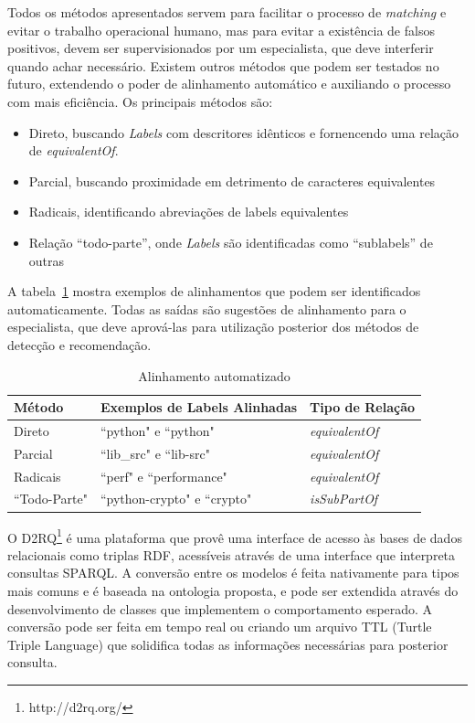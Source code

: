 \documentclass[sigconf]{acmart}
\begin{document}
Todos os métodos apresentados servem para facilitar o processo de \textit{matching} e evitar o trabalho operacional humano, mas para evitar a existência de falsos positivos, devem ser supervisionados por um especialista, que deve interferir quando achar necessário. Existem outros métodos que podem ser testados no futuro, extendendo o poder de alinhamento automático e auxiliando o processo com mais eficiência. Os principais métodos são:

\begin{itemize}
  \item Direto, buscando \textit{Labels} com descritores idênticos e fornencendo uma relação de \textit{equivalentOf}.
  \item Parcial, buscando proximidade em detrimento de caracteres equivalentes
  \item Radicais, identificando abreviações de labels equivalentes
  \item Relação ``todo-parte'', onde \textit{Labels} são identificadas como ``sublabels'' de outras
\end{itemize}

A tabela~\ref{tab:matching} mostra exemplos de alinhamentos que podem ser identificados automaticamente. Todas as saídas são sugestões de alinhamento para o especialista, que deve aprová-las para utilização posterior dos métodos de detecção e recomendação.

\begin{table}[!h]
  \centering
\begin{tabular}{@{}|l|l|l|@{}}
\hline
Método       & Exemplos de Labels Alinhadas           & Tipo de Relação                 \\ \hline
Direto       & ``python" e ``python"        & \textit{equivalentOf}           \\
Parcial      & ``lib\_src" e ``lib-src"     & \textit{equivalentOf}           \\
Radicais     & ``perf" e ``performance"     & \textit{equivalentOf}           \\
``Todo-Parte" & ``python-crypto" e ``crypto" & \textit{isSubPartOf} \\ \hline
\end{tabular}
\caption{Alinhamento automatizado}\label{tab:matching}
\end{table}

O D2RQ\footnote{http://d2rq.org/} é uma plataforma que provê uma interface de acesso às bases de dados relacionais como triplas RDF, acessíveis através de uma interface que interpreta consultas SPARQL. A conversão entre os modelos é feita nativamente para tipos mais comuns e é baseada na ontologia proposta, e pode ser extendida através do desenvolvimento de classes que implementem o comportamento esperado. A conversão pode ser feita em tempo real ou criando um arquivo TTL (Turtle Triple Language) que solidifica todas as informações necessárias para posterior consulta.
\end{document}
